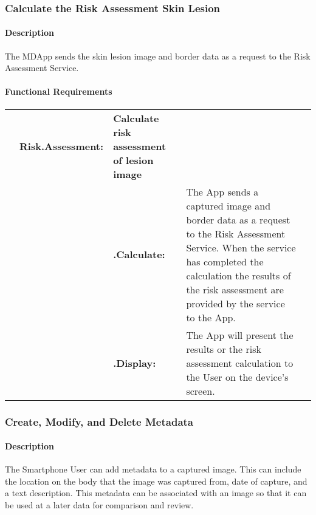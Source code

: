 {        \subsubsection{Calculate the Risk Assessment Skin Lesion}

            \paragraph{Description}

            The MDApp sends the skin lesion image and border data as a request to the Risk Assessment Service.

            \paragraph{Functional Requirements}
                \begin{longtable}[H]{ >{\bfseries}l >{\bfseries}l >{\bfseries}l p{9.5cm} l }

                    \hline
                    & \multicolumn{2}{>{\bfseries}l}
                    {Risk.Assessment:} & \textbf{Calculate risk assessment of lesion image}  \\

                    & & .Calculate: &
                    The App sends a captured image and border data as a request to the Risk Assessment Service. When the service has completed the calculation the results of the risk assessment are provided by the service to the App.
                    \\

                    & & .Display: &
                    The App will present the results or the risk assessment calculation to the User on the device’s screen.
                    \\
                    \hline
                \end{longtable}


        \subsubsection{Create, Modify, and Delete Metadata}

            \paragraph{Description}

            The Smartphone User can add metadata to a captured image. This can include the location on the body that the image was captured from, date of capture, and a text description. This metadata can be associated with an image so that it can be used at a later data for comparison and review.

}
